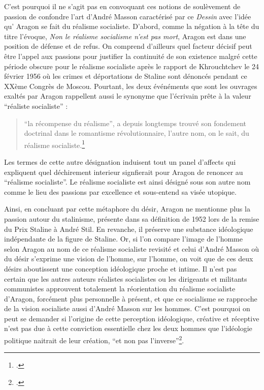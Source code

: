 C’est pourquoi il ne s’agit pas en convoquant ces notions de soulèvement de passion de confondre l’art d’André Masson caractérisé par ce \emph{Dessin} avec l’idée qu' Aragon se fait du réalisme socialiste. D’abord, comme la négation à la tête du titre l’évoque, \emph{Non le réalisme socialisme n’est pas mort}, Aragon est dans une position de défense et de refus. On comprend d’ailleurs quel facteur décisif peut être l’appel aux passions pour justifier la continuité de son existence malgré cette période obscure pour le réalisme socialiste après le rapport de Khrouchtchev le 24 février 1956 où les crimes et déportations de Staline sont dénoncés pendant ce XXème Congrès de Moscou. Pourtant, les deux événéments que sont les ouvrages exaltés par Aragon rappellent aussi le synonyme que l'écrivain prête à la valeur \enquote{réaliste socialiste} :  

\begin{quote}
\enquote{la récompense du réalisme}, a depuis longtemps trouvé son fondement doctrinal dans le romantisme révolutionnaire, l'autre nom, on le sait, du réalisme socialiste.\footcite[p1012]{these}\end{quote}

Les termes de cette autre désignation induisent tout un panel d'affects qui expliquent quel déchirement interieur signfierait pour Aragon de renoncer au \enquote{réalisme socialiste}. Le réalisme socialiste est ainsi désigné sous son autre nom comme le lieu des passions par excellence et sous-entend sa visée utopique. 


	 Ainsi, en concluant par cette métaphore du désir, Aragon ne mentionne plus la passion autour du stalinisme, présente dans sa définition de 1952 lors de la remise du Prix Staline à André Stil. En revanche, il préserve une substance idéologique indépendante de la figure de Staline. Or, si l’on compare l’image de l’homme selon Aragon au nom de ce réalisme socialiste revisité et celui d’André Masson où du désir s’exprime une vision de l’homme, sur l’homme, on voit que de ces deux désirs aboutissent une conception idéologique proche et intime. Il n’est pas certain que les autres auteurs réalistes socialistes ou les dirigeants et militants communistes approuvent totalement la réorientation du réalisme socialiste d’Aragon, forcément plus personnelle à présent, et que ce socialisme se rapproche de la vision socialiste aussi d’André Masson sur les hommes. C’est pourquoi on peut se demander si l’origine de cette perception idéologique, créative et réceptive n’est pas due à cette conviction essentielle chez les deux hommes que l’idéologie politique naitrait de leur création, \enquote{et non pas l’inverse}\footcite{}. 


